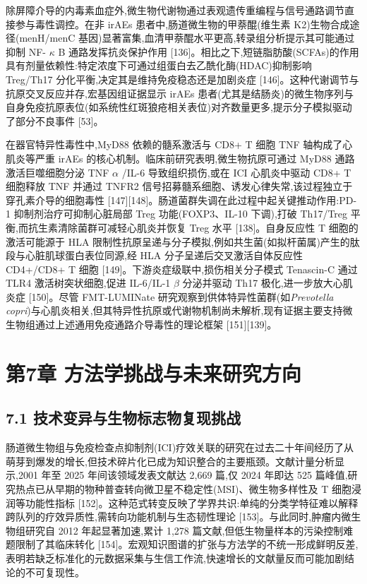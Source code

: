 \documentclass[11pt]{article}
\begin{document}
除屏障介导的内毒素血症外,微生物代谢物通过表观遗传重编程与信号通路调节直接参与毒性调控。在非 irAEs 患者中,肠道微生物的甲萘醌(维生素 K2)生物合成途径(menH/menC 基因)显著富集,血清甲萘醌水平更高,转录组分析提示其可能通过抑制 NF- \(\kappa\) B 通路发挥抗炎保护作用 {[}136{]}。相比之下,短链脂肪酸(SCFAs)的作用具有剂量依赖性:特定浓度下可通过组蛋白去乙酰化酶(HDAC)抑制影响 Treg/Th17 分化平衡,决定其是维持免疫稳态还是加剧炎症 {[}146{]}。这种代谢调节与抗原交叉反应并存,宏基因组证据显示 irAEs 患者(尤其是结肠炎)的微生物序列与自身免疫抗原表位(如系统性红斑狼疮相关表位)对齐数量更多,提示分子模拟驱动了部分不良事件 {[}53{]}。

在器官特异性毒性中,MyD88 依赖的髓系激活与 CD8+ T 细胞 TNF 轴构成了心肌炎等严重 irAEs 的核心机制。临床前研究表明,微生物抗原可通过 MyD88 通路激活巨噬细胞分泌 TNF \(\alpha\) /IL-6 导致组织损伤,或在 ICI 心肌炎中驱动 CD8+ T 细胞释放 TNF 并通过 TNFR2 信号招募髓系细胞、诱发心律失常,该过程独立于穿孔素介导的细胞毒性 {[}147{]}{[}148{]}。肠道菌群失调在此过程中起关键推动作用:PD-1 抑制剂治疗可抑制心脏局部 Treg 功能(FOXP3、IL-10 下调),打破 Th17/Treg 平衡,而抗生素清除菌群可减轻心肌炎并恢复 Treg 水平 {[}138{]}。自身反应性 T 细胞的激活可能源于 HLA 限制性抗原呈递与分子模拟,例如共生菌(如拟杆菌属)产生的肽段与心脏肌球蛋白表位同源,经 HLA 分子呈递后交叉激活自体反应性 CD4+/CD8+ T 细胞 {[}149{]}。下游炎症级联中,损伤相关分子模式 Tenascin-C 通过 TLR4 激活树突状细胞,促进 IL-6/IL-1 \(\beta\) 分泌并驱动 Th17 极化,进一步放大心肌炎症 {[}150{]}。尽管 FMT-LUMINate 研究观察到供体特异性菌群(如\emph{Prevotella copri})与心肌炎相关,但其特异性抗原或代谢物机制尚未解析,现有证据主要支持微生物组通过上述通用免疫通路介导毒性的理论框架 {[}151{]}{[}139{]}。

\section{第7章 方法学挑战与未来研究方向}\label{ux7b2c7ux7ae0-ux65b9ux6cd5ux5b66ux6311ux6218ux4e0eux672aux6765ux7814ux7a76ux65b9ux5411}

\subsection{7.1 技术变异与生物标志物复现挑战}\label{ux6280ux672fux53d8ux5f02ux4e0eux751fux7269ux6807ux5fd7ux7269ux590dux73b0ux6311ux6218}

肠道微生物组与免疫检查点抑制剂(ICI)疗效关联的研究在过去二十年间经历了从萌芽到爆发的增长,但技术碎片化已成为知识整合的主要瓶颈。文献计量分析显示,2001 年至 2025 年间该领域发表文献达 2,669 篇,仅 2024 年即达 525 篇峰值,研究热点已从早期的物种普查转向微卫星不稳定性(MSI)、微生物多样性及 T 细胞浸润等功能性指标 {[}152{]}。这种范式转变反映了学界共识:单纯的分类学特征难以解释跨队列的疗效异质性,需转向功能机制与生态韧性理论 {[}153{]}。与此同时,肿瘤内微生物组研究自 2012 年起显著加速,累计 1,278 篇文献,但低生物量样本的污染控制难题限制了其临床转化 {[}154{]}。宏观知识图谱的扩张与方法学的不统一形成鲜明反差,表明若缺乏标准化的元数据采集与生信工作流,快速增长的文献量反而可能加剧结论的不可复现性。
\end{document}
